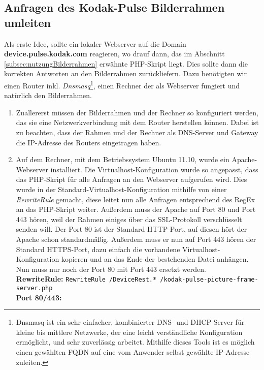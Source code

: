 \begin{flushleft}
  \subsection{Anfragen des Kodak-Pulse Bilderrahmen umleiten}
    Als erste Idee, sollte ein lokaler Webserver auf die Domain \textbf{device.pulse.kodak.com} reagieren, wo drauf dann, das im Abschnitt \ref{subsec:nutzungBilderrahmen}  erwähnte PHP-Skript liegt. Dies sollte dann die korrekten Antworten an den Bilderrahmen zurückliefern.
    Dazu benötigten wir einen Router inkl. \textit{Dnsmasq}\footnote{Dnsmasq ist ein sehr einfacher, kombinierter DNS- und DHCP-Server für kleine bis mittlere Netzwerke, der eine leicht verständliche Konfiguration ermöglicht, und sehr zuverlässig arbeitet. Mithilfe dieses Tools ist es möglich einen gewählten FQDN auf eine vom Anwender selbst gewählte IP-Adresse zuleiten.}, einen Rechner der als Webserver fungiert und natürlich den Bilderrahmen.
    \begin{enumerate}
      \item Zuallererst müssen der Bilderrahmen und der Rechner so konfiguriert werden, das sie eine Netzwerkverbindung mit dem Router herstellen können. Dabei ist zu beachten, dass der Rahmen und der Rechner als DNS-Server und Gateway die IP-Adresse des Routers eingetragen haben.
      \item Auf dem Rechner, mit dem Betriebssystem Ubuntu 11.10, wurde ein Apache-Webserver installiert. Die Virtualhost-Konfiguration wurde so angepasst, dass das PHP-Skript für alle Anfragen an den Webserver aufgerufen wird. Dies wurde in der Standard-Virtualhost-Konfiguration mithilfe von einer \textit{RewriteRule} gemacht, diese leitet nun alle Anfragen entsprechend des RegEx an das PHP-Skript weiter. Außerdem muss der Apache auf Port 80 und Port 443 hören, weil der Rahmen einiges über das SSL-Protokoll verschlüsselt senden will. Der Port 80 ist der Standard HTTP-Port, auf diesen hört der Apache schon standardmäßig. Außerdem muss er nun auf Port 443 hören der Standard HTTPS-Port, dazu einfach die vorhandene Virtualhost-Konfiguration kopieren und an das Ende der bestehenden Datei anhängen. Nun muss nur noch der Port 80 mit Port 443 ersetzt werden.\\\vspace{.3cm}
      \textbf{RewriteRule:}
      \verb|RewriteRule /DeviceRest.* /kodak-pulse-picture-frame-server.php|\\
      \vspace{.5cm}
      \textbf{Port 80/443:}\\

\end{enumerate}
\end{flushleft}
